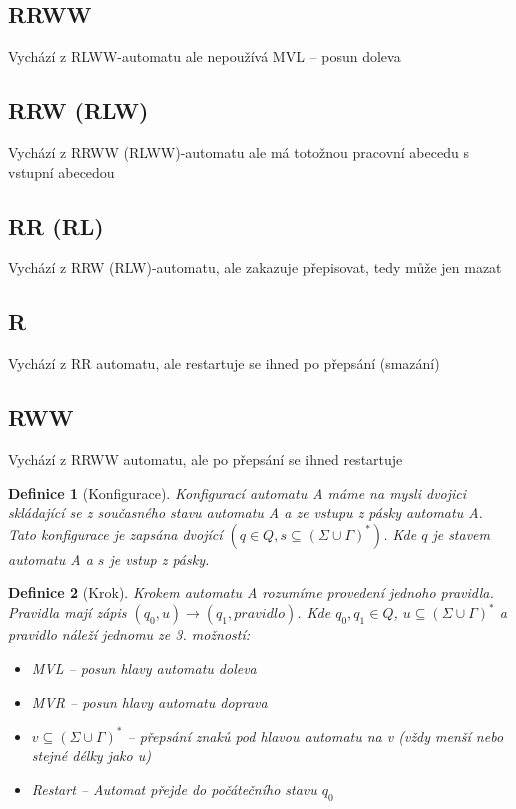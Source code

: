 \documentclass{article}
\newtheorem{theorem}{Definice}
\begin{document}
\subsection{RRWW}
Vychází z RLWW-automatu ale nepoužívá MVL -- posun doleva

\subsection{RRW (RLW)}
Vychází z RRWW (RLWW)-automatu ale má totožnou pracovní abecedu s vstupní abecedou

\subsection{RR (RL)}
Vychází z RRW (RLW)-automatu, ale zakazuje přepisovat, tedy může jen mazat

\subsection{R}
Vychází z RR automatu, ale restartuje se ihned po přepsání (smazání)

\subsection{RWW}
Vychází z RRWW automatu, ale po přepsání se ihned restartuje



\begin{theorem}[Konfigurace]
	Konfigurací automatu A máme na mysli dvojici skládající se z současného stavu automatu A a ze vstupu z pásky automatu A.
	Tato konfigurace je zapsána dvojící $(q \in Q, s \subseteq (\Sigma \cup \Gamma)^* )$.
	Kde $q$ je stavem automatu A a $s$ je vstup z pásky.
\end{theorem}

\begin{theorem}[Krok]
	Krokem automatu A rozumíme provedení jednoho pravidla.
	Pravidla mají zápis $(q_0, u) \to (q_1, pravidlo)$.
	Kde $q_0, q_1 \in Q$, $u \subseteq (\Sigma \cup \Gamma)^*$ a pravidlo náleží jednomu ze 3. možností:
	\begin{itemize}
		\item MVL -- posun hlavy automatu doleva
		\item MVR -- posun hlavy automatu doprava
		\item $v \subseteq (\Sigma \cup \Gamma)^*$  -- přepsání znaků pod hlavou automatu na v (vždy menší nebo stejné délky jako u)
		\item Restart -- Automat přejde do počátečního stavu $q_0$
	\end{itemize}
\end{theorem}
\end{document}
